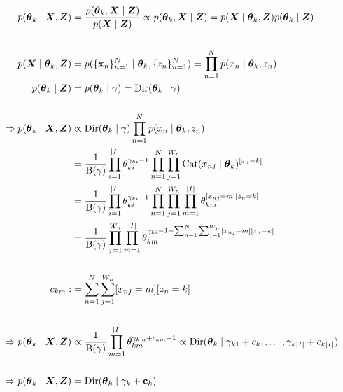 \begin{enumerate}
   \begin{align*}
       p(\boldsymbol{\theta}_k \mid \boldsymbol{X}, \boldsymbol{Z}) &= \frac{p(\boldsymbol{\theta}_k, \boldsymbol{X}\mid \boldsymbol{Z})}{p(\boldsymbol{X}\mid \boldsymbol{Z})} \propto p(\boldsymbol{\theta}_k, \boldsymbol{X}\mid \boldsymbol{Z}) = p(\boldsymbol{X} \mid \boldsymbol{\theta}_k, \boldsymbol{Z}) p(\boldsymbol{\theta}_k \mid \boldsymbol{Z}) \\
       \\
       p(\boldsymbol{X} \mid \boldsymbol{\theta}_k, \boldsymbol{Z}) &= p(\{\bold{x}_n\}_{n=1}^N\mid \boldsymbol{\theta}_k, \{z_n\}_{n=1}^N) = \prod_{n=1}^N p(x_n \mid \boldsymbol{\theta}_k, z_n)\\
       p(\boldsymbol{\theta}_k \mid \boldsymbol{Z}) &= p(\boldsymbol{\theta}_k \mid \gamma) = \operatorname{Dir}(\boldsymbol{\theta}_k \mid \gamma)\\
       \\
       \Rightarrow p(\boldsymbol{\theta}_k \mid \boldsymbol{X}, \boldsymbol{Z}) &\propto \operatorname{Dir}(\boldsymbol{\theta}_k \mid \gamma) \prod_{n=1}^N p(x_n \mid \boldsymbol{\theta}_k, z_n) \\
       &= \frac{1}{\operatorname{B}(\gamma)} \prod_{i=1}^{\vert I\vert} \theta_{ki}^{\gamma_{ki} - 1} \prod_{n=1}^N \prod_{j=1}^{W_n} \operatorname{Cat}(x_{nj} \mid \boldsymbol{\theta}_k)^{[z_n = k]}\\
       &= \frac{1}{\operatorname{B}(\gamma)} \prod_{i=1}^{\vert I\vert} \theta_{ki}^{\gamma_{ki} - 1} \prod_{n=1}^N \prod_{j=1}^{W_n} \prod_{m=1}^{\vert I \vert} \theta_{km}^{[x_{nj} = m][z_n = k]} \\
       &= \frac{1}{\operatorname{B}(\gamma)} \prod_{j=1}^{W_n} \prod_{m=1}^{\vert I \vert} \theta_{km}^{\gamma_{ki} - 1 + \sum_{n=1}^N \sum_{j=1}^{W_n}[x_{nj} = m][z_n = k]}\\ \\
       c_{km} :&= \sum_{n=1}^N \sum_{j=1}^{W_n}[x_{nj} = m][z_n = k] \\\\
       \Rightarrow p(\boldsymbol{\theta}_k \mid \boldsymbol{X}, \boldsymbol{Z}) &\propto \frac{1}{\operatorname{B}(\gamma)} \prod_{m=1}^{\vert I \vert} \theta_{km}^{\gamma_{km} + c_{km} - 1} \propto \operatorname{Dir}(\boldsymbol{\theta}_k \mid \gamma_{k1}+c_{k1}, \ldots, \gamma_{k\vert I\vert} + c_{k\vert I \vert}) \\\\
       \Rightarrow p(\boldsymbol{\theta}_k \mid \boldsymbol{X}, \boldsymbol{Z}) &= \operatorname{Dir}(\boldsymbol{\theta}_k \mid \mathbf{\gamma}_k + \mathbf{c}_k)
   \end{align*}
   

\end{enumerate}
